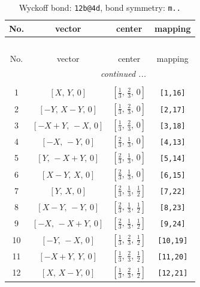 \documentclass[fleqn,8pt]{jsarticle}
\begin{document}
\renewcommand{\arraystretch}{1.2}
\begin{longtable}{cccc}
\caption{Wyckoff bond: {\tt 12b@4d}, bond symmetry: {\tt m..}}
 \\
 \hline \hline
No. & vector & center & mapping \\ \hline \endfirsthead

\multicolumn{3}{l}{\tablename\ \thetable{}} \\
 \hline \hline
No. & vector & center & mapping \\ \hline \endhead

 \hline \hline
\multicolumn{3}{r}{\footnotesize\it continued ...} \\ \endfoot

 \hline \hline
\multicolumn{3}{r}{} \\ \endlastfoot

1 & $\left[ X,\, Y,\, 0 \right]$ & $\left[ \frac{1}{3},\, \frac{2}{3},\, 0 \right]$ & {\tt [1,16]} \\ \hline
2 & $\left[ - Y,\, X - Y,\, 0 \right]$ & $\left[ \frac{1}{3},\, \frac{2}{3},\, 0 \right]$ & {\tt [2,17]} \\ \hline
3 & $\left[ - X + Y,\, - X,\, 0 \right]$ & $\left[ \frac{1}{3},\, \frac{2}{3},\, 0 \right]$ & {\tt [3,18]} \\ \hline
4 & $\left[ - X,\, - Y,\, 0 \right]$ & $\left[ \frac{2}{3},\, \frac{1}{3},\, 0 \right]$ & {\tt [4,13]} \\ \hline
5 & $\left[ Y,\, - X + Y,\, 0 \right]$ & $\left[ \frac{2}{3},\, \frac{1}{3},\, 0 \right]$ & {\tt [5,14]} \\ \hline
6 & $\left[ X - Y,\, X,\, 0 \right]$ & $\left[ \frac{2}{3},\, \frac{1}{3},\, 0 \right]$ & {\tt [6,15]} \\ \hline
7 & $\left[ Y,\, X,\, 0 \right]$ & $\left[ \frac{2}{3},\, \frac{1}{3},\, \frac{1}{2} \right]$ & {\tt [7,22]} \\ \hline
8 & $\left[ X - Y,\, - Y,\, 0 \right]$ & $\left[ \frac{2}{3},\, \frac{1}{3},\, \frac{1}{2} \right]$ & {\tt [8,23]} \\ \hline
9 & $\left[ - X,\, - X + Y,\, 0 \right]$ & $\left[ \frac{2}{3},\, \frac{1}{3},\, \frac{1}{2} \right]$ & {\tt [9,24]} \\ \hline
10 & $\left[ - Y,\, - X,\, 0 \right]$ & $\left[ \frac{1}{3},\, \frac{2}{3},\, \frac{1}{2} \right]$ & {\tt [10,19]} \\ \hline
11 & $\left[ - X + Y,\, Y,\, 0 \right]$ & $\left[ \frac{1}{3},\, \frac{2}{3},\, \frac{1}{2} \right]$ & {\tt [11,20]} \\ \hline
12 & $\left[ X,\, X - Y,\, 0 \right]$ & $\left[ \frac{1}{3},\, \frac{2}{3},\, \frac{1}{2} \right]$ & {\tt [12,21]} \\
\end{longtable}
\end{document}
